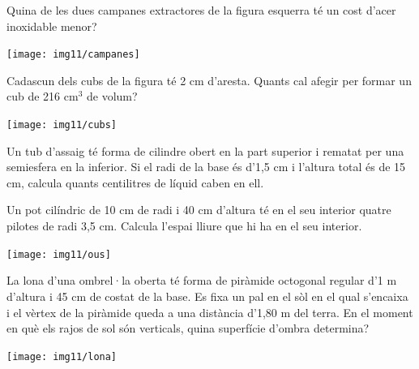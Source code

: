 \begin{activitats}
\begin{mylist}
\exer \hot Quina de les dues campanes extractores de la figura esquerra té un cost d'acer inoxidable menor?
\vspace{-0.25cm}
\begin{center}
	\hspace{-1cm}\texttt{[image: img11/campanes]}
\end{center}


\exer  Cadascun dels cubs de la figura té 2 cm d'aresta. Quants cal afegir per formar un cub de 216 cm${}^{3}$ de volum? 
\begin{center}
	\texttt{[image: img11/cubs]}
\end{center}


\exer  Un tub d'assaig té forma de cilindre obert en la part superior i rematat per una semiesfera en la inferior. Si el radi de la base és d'1,5 cm i l'altura total és de 15 cm, calcula quants centilitres de líquid caben en ell. 


\exer  Un pot cilíndric de 10 cm de radi i 40 cm d'altura té en el seu interior quatre pilotes de radi 3,5 cm. Calcula l'espai lliure que hi ha en el seu interior.

\begin{center}
\texttt{[image: img11/ous]}
\end{center}


\exer  La lona d'una ombrel·la oberta té forma de piràmide octogonal regular \linebreak d'1 m d'altura i 45 cm de costat de la base. Es fixa un pal en el sòl en el qual s'encaixa i el vèrtex de la piràmide queda a una distància d'1,80 m del terra. En el moment en què els rajos de sol són verticals, quina superfície d'ombra determina?  
\begin{center}
	\texttt{[image: img11/lona]}
\end{center}


\end{mylist}
\end{activitats}
